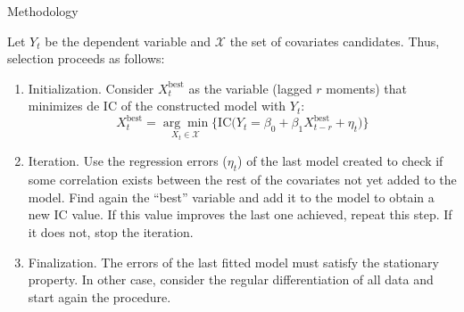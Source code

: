 \documentclass[10pt]{beamer}
\begin{document}
\begin{frame}{Methodology}
    

    Let $Y_t$ be the dependent variable and $\mathcal{X}$ the set of covariates candidates. Thus, selection proceeds as follows:
    
    \begin{enumerate}
        \item Initialization. Consider $X_t^\text{best}$ as the variable (lagged $r$ moments) that minimizes de IC of the constructed model with $Y_t$:
        \[ X_t^\text{best} = \underset{X_t\in\mathcal{X}}{\arg\min} \Bigg\{ \text{IC}\Bigg( Y_t = \beta_0 + \beta_1 X_{t-r}^\text{best} + \eta_t \Bigg)\Bigg\} \] 
        \item Iteration. Use the regression errors ($\eta_t$) of the last model created to check if some correlation exists between the rest of the covariates not yet added to the model. Find again the ``best'' variable and add it to the model to obtain a new IC value. If this value improves the last one achieved, repeat this step. If it does not, stop the iteration.
        \item Finalization. The errors of the last fitted model must satisfy the stationary property. In other case, consider the regular differentiation of all data and start again the procedure.
    \end{enumerate}
\end{frame}
\end{document}
